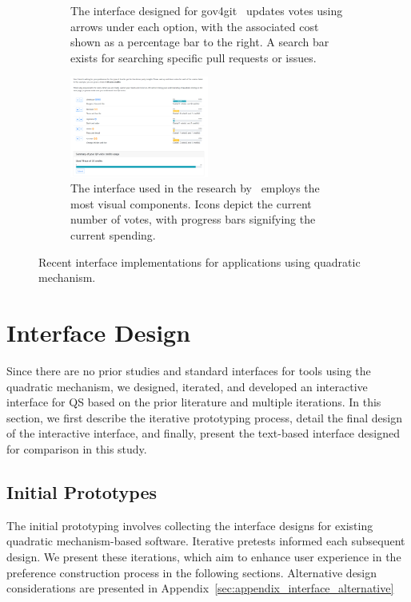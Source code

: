 {\begin{figure}[p]
\begin{subfigure}[b]{0.47\textwidth}
        \caption{The interface designed for gov4git~\cite{Gov4gitDecentralizedPlatform2023} updates votes using arrows under each option, with the associated cost shown as a percentage bar to the right. A search bar exists for searching specific pull requests or issues.}
        \label{fig:gov4gitInterface}
    \end{subfigure}
    
    \vspace{0.2cm}
    
    \begin{subfigure}[b]{0.7\textwidth}
        \centering
        \includegraphics[width=0.50\textwidth]{content/image/curr_interface/cheng_qv.png}
        \caption{The interface used in the research by~\textcite{chengCanShowWhat2021} employs the most visual components. Icons depict the current number of votes, with progress bars signifying the current spending.}
        \label{fig:chengInterface}
    \end{subfigure}
    
    \caption{Recent interface implementations for applications using quadratic mechanism.}
    \label{fig:qv_interface_external}
\end{figure}
\clearpage
}

\section{Interface Design}
\label{sec:interfaceDesign}
Since there are no prior studies and standard interfaces for tools using the quadratic mechanism, we designed, iterated, and developed an interactive interface for QS based on the prior literature and multiple iterations. In this section, we first describe the iterative prototyping process, detail the final design of the interactive interface, and finally, present the text-based interface designed for comparison in this study.

\subsection{Initial Prototypes}
The initial prototyping involves collecting the interface designs for existing quadratic mechanism-based software. Iterative pretests informed each subsequent design. We present these iterations, which aim to enhance user experience in the preference construction process in the following sections. Alternative design considerations are presented in Appendix~\ref{sec:appendix_interface_alternative}

